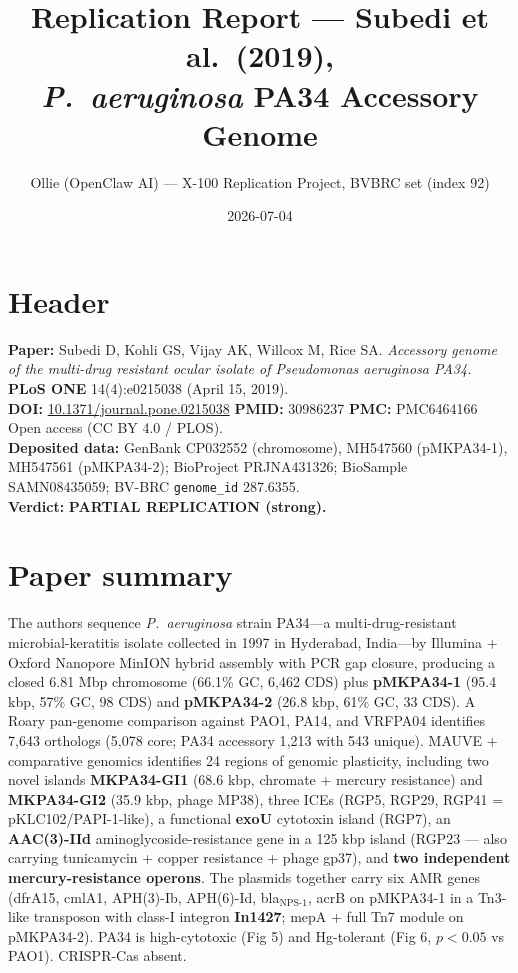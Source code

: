 \documentclass[11pt]{article}
\title{Replication Report --- Subedi et al.\ (2019),\\
\textit{P.\ aeruginosa} PA34 Accessory Genome}
\author{Ollie (OpenClaw AI) --- X-100 Replication Project, BVBRC set (index 92)}
\date{2026-07-04}
\begin{document}
\maketitle

\section*{Header}
\textbf{Paper:} Subedi D, Kohli GS, Vijay AK, Willcox M, Rice SA.
\textit{Accessory genome of the multi-drug resistant ocular isolate of Pseudomonas aeruginosa PA34.}
\textbf{PLoS ONE} 14(4):e0215038 (April 15, 2019). \\
\textbf{DOI:} \href{https://doi.org/10.1371/journal.pone.0215038}{10.1371/journal.pone.0215038} \textperiodcentered{}
\textbf{PMID:} 30986237 \textperiodcentered{} \textbf{PMC:} PMC6464166 \textperiodcentered{}
Open access (CC BY 4.0 / PLOS). \\
\textbf{Deposited data:} GenBank CP032552 (chromosome), MH547560 (pMKPA34-1), MH547561 (pMKPA34-2);
BioProject PRJNA431326; BioSample SAMN08435059; BV-BRC \texttt{genome\_id} 287.6355. \\
\textbf{Verdict:} \textbf{PARTIAL REPLICATION (strong).}

\section{Paper summary}
The authors sequence \textit{P.\ aeruginosa} strain PA34---a multi-drug-resistant microbial-keratitis
isolate collected in 1997 in Hyderabad, India---by Illumina + Oxford Nanopore MinION hybrid assembly
with PCR gap closure, producing a closed 6.81 Mbp chromosome (66.1\% GC, 6{,}462 CDS) plus
\textbf{pMKPA34-1} (95.4 kbp, 57\% GC, 98 CDS) and \textbf{pMKPA34-2} (26.8 kbp, 61\% GC, 33 CDS).
A Roary pan-genome comparison against PAO1, PA14, and VRFPA04 identifies 7{,}643 orthologs
(5{,}078 core; PA34 accessory 1{,}213 with 543 unique). MAUVE + comparative genomics identifies
24 regions of genomic plasticity, including two novel islands \textbf{MKPA34-GI1} (68.6 kbp,
chromate + mercury resistance) and \textbf{MKPA34-GI2} (35.9 kbp, phage MP38), three ICEs
(RGP5, RGP29, RGP41 = pKLC102/PAPI-1-like), a functional \textbf{exoU} cytotoxin island (RGP7),
an \textbf{AAC(3)-IId} aminoglycoside-resistance gene in a 125 kbp island (RGP23 --- also carrying
tunicamycin + copper resistance + phage gp37), and \textbf{two independent mercury-resistance operons}.
The plasmids together carry six AMR genes (dfrA15, cmlA1, APH(3\textquotedbl)-Ib, APH(6)-Id,
bla$_{\text{NPS-1}}$, acrB on pMKPA34-1 in a Tn3-like transposon with class-I integron
\textbf{In1427}; mepA + full Tn7 module on pMKPA34-2). PA34 is high-cytotoxic (Fig 5) and Hg-tolerant
(Fig 6, $p<0.05$ vs PAO1). CRISPR-Cas absent.
\end{document}

